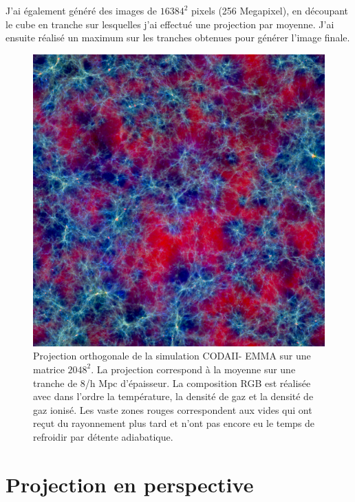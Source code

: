 J'ai également généré des images de $16384^2$ pixels (256 Megapixel), en découpant le cube en tranche sur lesquelles j'ai effectué une projection par moyenne.
J'ai ensuite réalisé un maximum sur les tranches obtenues pour générer l'image finale.



\begin{figure}[bth]
        \includegraphics[width=.95\textwidth]{img/04/rgb-compose.jpeg} 
        \caption[Projection orthogonale]{Projection orthogonale de la simulation CODAII- EMMA sur une matrice $2048^2$.
        La projection correspond à la moyenne sur une tranche de 8/h Mpc d'épaisseur. 
        La composition RGB est réalisée avec dans l'ordre la température, la densité de gaz et la densité de gaz ionisé.
		Les vaste zones rouges correspondent aux vides qui ont reçut du rayonnement plus tard et n'ont pas encore eu le temps de refroidir par détente adiabatique.  
        }
 		\label{fig:ortho}
\end{figure}


\clearpage
\section{Projection en perspective}

